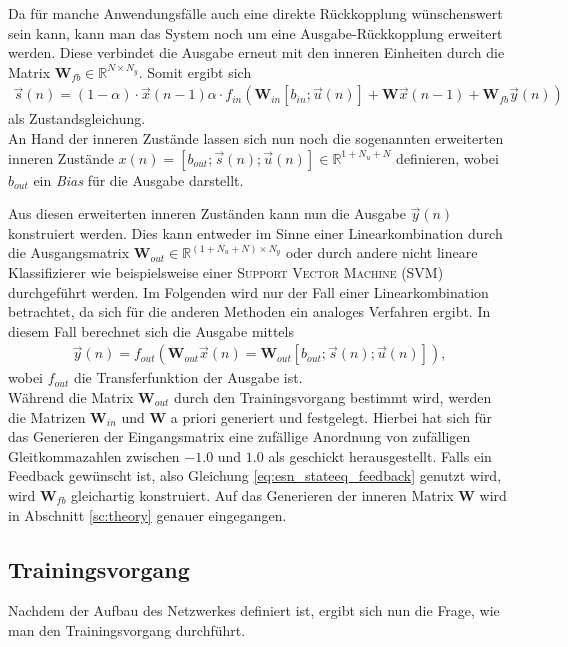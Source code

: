 Da für manche Anwendungsfälle auch eine direkte Rückkopplung wünschenswert sein kann, kann man das System noch um eine Ausgabe-Rückkopplung erweitert werden. Diese verbindet die Ausgabe erneut mit den inneren Einheiten durch die Matrix $\mathbf{W}_{fb} \in \mathbb{R}^{N \times N_y}$.
Somit ergibt sich 
\begin{align}
\label{eq:esn_stateeq_feedback}
\vec{s}(n) = (1 - \alpha) \cdot \vec{x}(n-1)  \alpha \cdot f_{in}\left( \mathbf{W}_{in} [b_{in}; \vec{u}(n)] + \mathbf{W} \vec{x}(n-1) + \mathbf{W}_{fb} \vec{y}(n) \right)
\end{align}
als Zustandsgleichung.\\

An Hand der inneren Zustände lassen sich nun noch die sogenannten erweiterten inneren Zustände $x(n) = [b_{out}; \vec{s}(n); \vec{u}(n)] \in \mathbb{R}^{1 + N_u + N}$ definieren, wobei $b_{out}$ ein \textit{Bias} für die Ausgabe darstellt. 

Aus diesen erweiterten inneren Zuständen kann nun die Ausgabe $\vec{y}(n)$ konstruiert werden. Dies kann entweder im Sinne einer Linearkombination durch die Ausgangsmatrix $\mathbf{W}_{out} \in \mathbb{R}^{(1 + N_u + N) \times N_y}$ oder durch andere nicht lineare Klassifizierer wie beispielsweise einer \textsc{Support Vector Machine (SVM)} durchgeführt werden. Im Folgenden wird nur der Fall einer Linearkombination betrachtet, da sich für die anderen Methoden ein analoges Verfahren ergibt.
In diesem Fall berechnet sich die Ausgabe mittels
\begin{align}
\vec{y}(n) = f_{out} \left( \mathbf{W}_{out} \vec{x}(n) = \mathbf{W}_{out} [b_{out}; \vec{s}(n); \vec{u}(n)] \right),
\end{align}
wobei $f_{out}$ die Transferfunktion der Ausgabe ist.\\

Während die Matrix $\mathbf{W}_{out}$ durch den Trainingsvorgang bestimmt wird, werden die Matrizen $\mathbf{W}_{in}$ und $\mathbf{W}$ a priori generiert und festgelegt. Hierbei hat sich für das Generieren der Eingangsmatrix eine zufällige Anordnung von zufälligen Gleitkommazahlen zwischen $-1.0$ und $1.0$ als geschickt herausgestellt. Falls ein Feedback gewünscht ist, also Gleichung \ref{eq:esn_stateeq_feedback} genutzt wird, wird $\mathbf{W}_{fb}$ gleichartig konstruiert. Auf das Generieren der inneren Matrix $\mathbf{W}$ wird in Abschnitt \ref{sc:theory} genauer eingegangen.

\subsection{Trainingsvorgang}
Nachdem der Aufbau des Netzwerkes definiert ist, ergibt sich nun die Frage, wie man den Trainingsvorgang durchführt.

